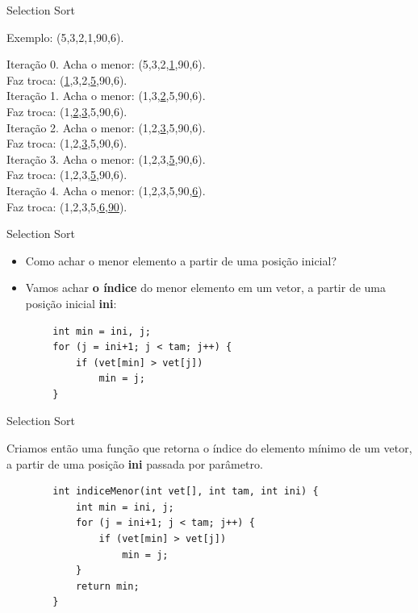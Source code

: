 \documentclass[handout]{beamer}
\begin{document}
\begin{frame}[fragile]{Selection Sort}
    
    Exemplo: (5,3,2,1,90,6).

    Iteração 0.
    Acha o menor: (5,3,2,{\color{blue}\underline{1}},90,6).\\
    Faz troca: ({\color{red}\underline{1}},3,2,{\color{red}\underline{5}},90,6).\\
    \pause
    Iteração 1.
    Acha o menor: (1,3,{\color{blue}\underline{2}},5,90,6).\\
    Faz troca: (1,{\color{red}\underline{2}},{\color{red}\underline{3}},5,90,6).\\
    \pause
    Iteração 2.
    Acha o menor: (1,2,{\color{blue}\underline{3}},5,90,6).\\
    Faz troca: (1,2,{\color{red}\underline{3}},5,90,6).\\
    \pause
    Iteração 3.
    Acha o menor: (1,2,3,{\color{blue}\underline{5}},90,6).\\
    Faz troca: (1,2,3,{\color{red}\underline{5}},90,6).\\
    \pause
    Iteração 4.
    Acha o menor: (1,2,3,5,90,{\color{blue}\underline{6}}).\\
    Faz troca: (1,2,3,5,{\color{red}\underline{6}},{\color{red}\underline{90}}).
    
\end{frame}

\begin{frame}[fragile]{Selection Sort}

    \begin{itemize}
        \item Como achar o menor elemento a partir de uma posição inicial?
        \item Vamos achar {\bf o índice} do menor elemento em um vetor, a partir de uma posição inicial {\bf ini}:
    \end{itemize}

    \begin{verbatim}
        int min = ini, j;
        for (j = ini+1; j < tam; j++) {
            if (vet[min] > vet[j])
                min = j;
        }
    \end{verbatim}

\end{frame}

\begin{frame}[fragile]{Selection Sort}

    Criamos então uma função que retorna o índice do elemento mínimo de um vetor, a partir de uma posição {\bf ini} passada por parâmetro.

    \begin{verbatim}
        int indiceMenor(int vet[], int tam, int ini) {
            int min = ini, j;
            for (j = ini+1; j < tam; j++) {
                if (vet[min] > vet[j])
                    min = j;
            }
            return min;
        }
    \end{verbatim}

\end{frame}
\end{document}
